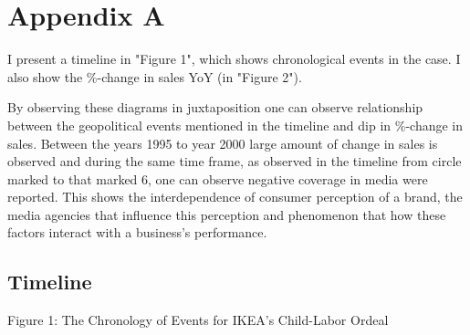 \section{Appendix A}

I present a timeline in "Figure 1", which shows chronological events in the case. I also show the \%-change in sales YoY (in "Figure 2"). 

By observing these diagrams in juxtaposition one can observe relationship between the geopolitical events mentioned in the timeline and dip in \%-change in sales. Between the years 1995 to year 2000 large amount of change in sales is observed and during the same time frame, as observed in the timeline from circle marked to that marked 6, one can observe negative coverage in media were reported. This shows the interdependence of consumer perception of a brand, the media agencies that influence this perception and phenomenon that how these factors interact with a business's performance. \\
\subsection{Timeline}
Figure 1: The Chronology of Events for IKEA's Child-Labor Ordeal \\

\begin{timeline}
\end{timeline}

\begin{timeline}
\end{timeline}